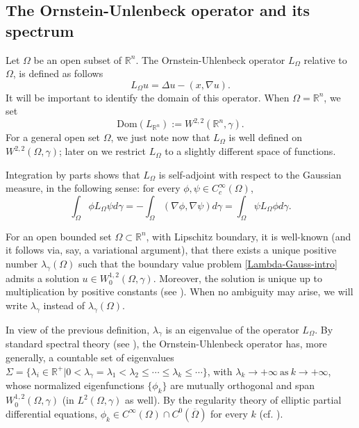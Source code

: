 \documentclass[12pt]{amsart}
\newcommand{\R}{\mathbb R}
\newcommand{\1}{\mathbf 1}
\begin{document}
\subsection{The Ornstein-Unlenbeck operator and its spectrum}\label{Se2-1}

Let $\Omega$ be an open subset of $\R^n$. The Ornstein-Uhlenbeck operator $L_\Omega$ relative to $\Omega$, is defined as follows
\[
L_\Omega u=\Delta u-(x,\nabla u).
\]
It will be important to identify the domain of this operator. When $\Omega=\R^n$, we set
$$
\text{Dom}(L_{\R^n}):=W^{2,2}(\R^n,\gamma).
$$
For a general open set $\Omega$, we just note now that $L_\Omega$ is well defined on $W^{2,2}(\Omega,\gamma)$; later on we restrict $L_\Omega$ to a slightly different space of functions.

Integration by parts shows that $L_\Omega$ is self-adjoint with respect to the Gaussian measure, in the following sense: for every $\phi,\psi \in C_{c}^\infty (\Omega)$,
\[
\int_{\Omega} \phi L_\Omega\psi d\gamma=-\int_{\Omega} (\nabla \phi, \nabla \psi)d\gamma=\int_{\Omega} \psi L_\Omega\phi d\gamma.
\]

\medskip

For an open bounded set $\Omega\subset\R^n$, with Lipschitz boundary, it is well-known (and it follows via, say, a variational argument), that there exists a unique positive number $\lambda_{\gamma}(\Omega)$ such that the boundary value problem \eqref{Lambda-Gauss-intro}
admits a solution $u\in W^{1,2}_0(\Omega,\gamma)$. Moreover, the solution is unique up to multiplication by positive constants (see \cite[Theorem 2.1]{CFLS24}). When no ambiguity may arise, we will write $\lambda_\gamma$ instead of $ \lambda_\gamma(\Omega)$.

In view of the previous definition, $\lambda_\gamma$ is an eigenvalue of the operator $L_\Omega$. By standard spectral theory (see \cite[Theorem 4.46]{Arendt-Urban2023}), the Ornstein-Uhlenbeck operator has, more generally, a countable set of eigenvalues $\Sigma=\{\lambda_i\in \R^{+}| 0<\lambda_\gamma=\lambda_1<\lambda_2\leq \cdots \leq \lambda_k\leq\cdots \}$, with $\lambda_k\rightarrow +\infty\ \text{as}\ k\rightarrow +\infty$, whose normalized eigenfunctions $\{ \phi_k\}$ are mutually orthogonal and span $W^{1,2}_0(\Omega,\gamma)$ (in $L^2(\Omega,\gamma)$ as well). By the regularity theory of elliptic partial differential equations, $\phi_k \in C^{\infty}(\Omega)\cap C^0(\overline{\Omega})$ for every $k$ (cf. \cite{Evans}).
\end{document}
